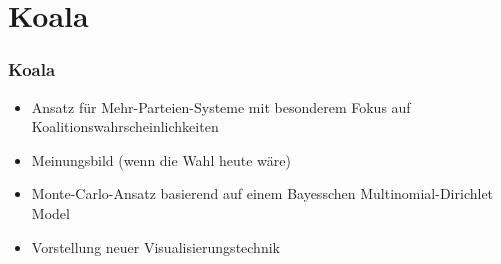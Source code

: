 \documentclass[aspectratio=169,xcolor=dvipsnames]{beamer}
\begin{document}
\section{Koala}

\begin{frame}
	\frametitle{Koala}
	\begin{itemize}
		\item Ansatz für Mehr-Parteien-Systeme mit besonderem Fokus auf Koalitionswahrscheinlichkeiten
		\item Meinungsbild (wenn die Wahl heute wäre) 
		\item Monte-Carlo-Ansatz basierend auf einem Bayesschen Multinomial-Dirichlet Model
		\item Vorstellung neuer Visualisierungstechnik
	\end{itemize}
\end{frame}
\end{document}
